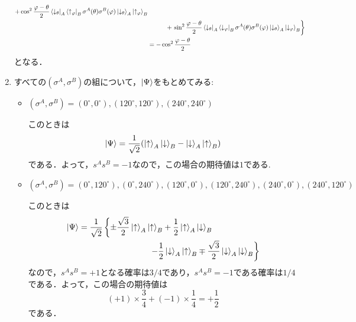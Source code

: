\documentclass[a4paper,pdflatex,ja=standard]{bxjsarticle}
\begin{document}
\begin{enumerate}
\begin{align}
    +
    \cos^2\frac{\varphi-\theta}{2}\bra{\downarrow_{\theta}}_{A}\bra{\uparrow_{\varphi}}_{B}\sigma^{A}(\theta)\sigma^{B}(\varphi)\ket{\downarrow_{\theta}}_{A}\ket{\uparrow_{\varphi}}_{B}
    \nonumber
    \\
    &\hspace*{1cm}+\left.
    \sin^2\frac{\varphi-\theta}{2}\bra{\downarrow_{\theta}}_{A}\bra{\downarrow_{\varphi}}_{B}\sigma^{A}(\theta)\sigma^{B}(\varphi)\ket{\downarrow_{\theta}}_{A}\ket{\downarrow_{\varphi}}_{B}
    \right\}
    \nonumber
    \\
    &=
    -\cos^2\frac{\varphi-\theta}{2}
  \end{align}
  となる．

  \item 
  すべての$(\sigma^{A},\sigma^{B})$の組について，$\ket{\Psi}$をもとめてみる:

  \begin{itemize}
    \item 
    $(\sigma^{A},\sigma^{B})=(0^{\circ},0^{\circ}),(120^{\circ},120^{\circ}),(240^{\circ},240^{\circ})$

    このときは
    \begin{equation}
      \ket{\Psi}
      =
      \frac{1}{\sqrt{2}}(\ket{\uparrow}_{A}\ket{\downarrow}_{B}-\ket{\downarrow}_{A}\ket{\uparrow}_{B})
    \end{equation}
    である．よって，$s^{A}s^{B}=-1$なので，この場合の期待値は$1$である.

    \item 
    $(\sigma^{A},\sigma^{B})=(0^{\circ},120^{\circ}),(0^{\circ},240^{\circ}),(120^{\circ},0^{\circ}),(120^{\circ},240^{\circ}),(240^{\circ},0^{\circ}),(240^{\circ},120^{\circ})$

    このときは
    \begin{align}
      \ket{\Psi}
      &=
      \frac{1}{\sqrt{2}}
      \left\{ 
      \pm\frac{\sqrt{3}}{2}\ket{\uparrow}_{A}\ket{\uparrow}_{B}
      +
      \frac{1}{2}\ket{\uparrow}_{A}\ket{\downarrow}_{B}
      \right.
      \nonumber
      \\
      &\hspace*{3cm}\left.
      -
      \frac{1}{2}\ket{\downarrow}_{A}\ket{\uparrow}_{B}
      \mp
      \frac{\sqrt{3}}{2}
      \ket{\downarrow}_{A}\ket{\downarrow}_{B}
      \right\}
    \end{align}
    なので，$s^{A}s^{B}=+1$となる確率は$3/4$であり，$s^{A}s^{B}=-1$である確率は$1/4$である．よって，この場合の期待値は
    \begin{equation}
      (+1)\times\frac{3}{4}+(-1)\times\frac{1}{4}
      =
      +\frac{1}{2}
    \end{equation}
    である．
  \end{itemize}


\end{enumerate}
\end{document}
